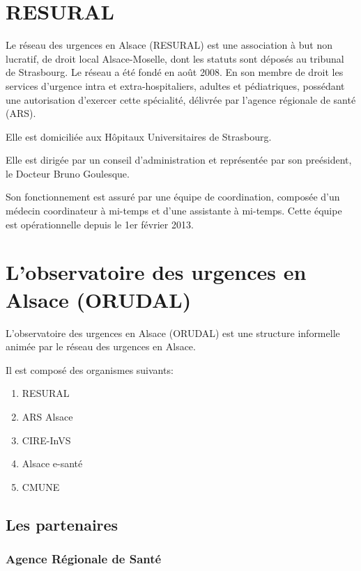 \documentclass[12pt,english,french,twoside]{report}\usepackage[]{graphicx}\usepackage[]{color}
\begin{document}
\newpage
\chapter{RESURAL}


Le réseau des urgences en Alsace (RESURAL) est une association à but non lucratif, de droit local Alsace-Moselle, dont les statuts sont déposés au tribunal de Strasbourg. Le réseau a été fondé en août 2008. En son membre de droit les services d'urgence intra et extra-hospitaliers, adultes et pédiatriques, possédant une autorisation d'exercer cette spécialité, délivrée par l'agence régionale de santé (ARS). 

Elle est domiciliée aux Hôpitaux Universitaires de Strasbourg.

Elle est dirigée par un conseil d'administration et représentée par son preésident, le Docteur Bruno Goulesque.

Son fonctionnement est assuré par une équipe de coordination, composée d'un médecin coordinateur à mi-temps et d'une assistante à mi-temps. Cette équipe est opérationnelle depuis le 1er février 2013.


\newpage
\chapter{L'observatoire des urgences en Alsace (ORUDAL)}


L'observatoire des urgences en Alsace (ORUDAL) est une structure informelle animée par le réseau des urgences en Alsace.

Il est composé des organismes suivants:
\begin{enumerate}
  \item RESURAL 
  \item ARS Alsace
  \item CIRE-InVS
  \item Alsace e-santé
  \item CMUNE
\end{enumerate}


\section*{Les partenaires}

  \subsection*{Agence Régionale de Santé}
    
\end{document}
